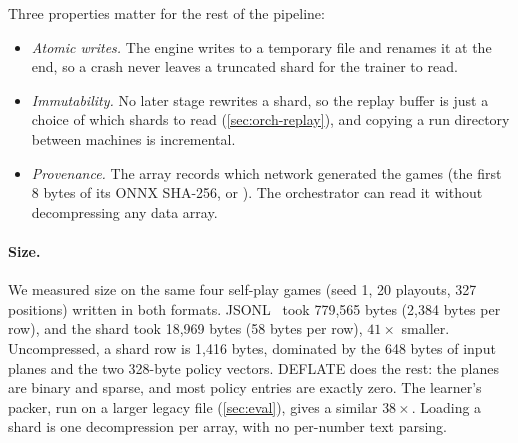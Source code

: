 Three properties matter for the rest of the pipeline:
\begin{itemize}
  \item \emph{Atomic writes.} The engine writes to a temporary file and renames it at the
        end, so a crash never leaves a truncated shard for the trainer to read.
  \item \emph{Immutability.} No later stage rewrites a shard, so the replay buffer is just a
        choice of which shards to read (\cref{sec:orch-replay}), and copying a run
        directory between machines is incremental.
  \item \emph{Provenance.} The  array records which network generated the games
        (the first 8 bytes of its ONNX SHA-256, or ). The orchestrator can
        read it without decompressing any data array.
\end{itemize}

\paragraph{Size.}
We measured size on the same four self-play games (seed 1, 20 playouts, 327 positions)
written in both formats. JSONL~\citep{bray2017json} took 779{,}565 bytes (2{,}384 bytes per
row), and the shard took 18{,}969 bytes (58 bytes per row), $41\times$ smaller.
Uncompressed, a shard row is 1{,}416 bytes, dominated by the 648 bytes of input planes and
the two 328-byte policy vectors. DEFLATE does the rest: the planes are binary and sparse,
and most policy entries are exactly zero. The learner's packer, run on a larger legacy file
(\cref{sec:eval}), gives a similar $38\times$. Loading a shard is one decompression per
array, with no per-number text parsing.
